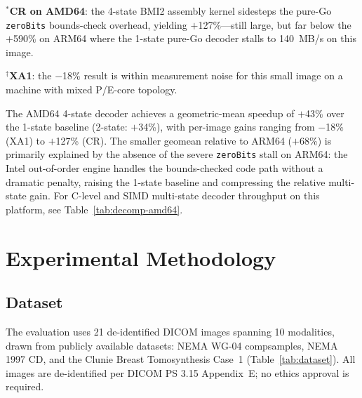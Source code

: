 \documentclass[journal]{IEEEtran}
\begin{document}
$^*$\textbf{CR on AMD64}: the 4-state BMI2 assembly kernel sidesteps the
pure-Go \texttt{zeroBits} bounds-check overhead, yielding $+$127\%---still
large, but far below the $+$590\% on ARM64 where the 1-state pure-Go
decoder stalls to 140~MB/s on this image.

$^\dagger$\textbf{XA1}: the $-$18\% result is within measurement noise for
this small image on a machine with mixed P/E-core topology.

The AMD64 4-state decoder achieves a geometric-mean speedup of $+$43\%
over the 1-state baseline (2-state: $+$34\%), with per-image gains
ranging from $-$18\% (XA1) to $+$127\% (CR). The smaller geomean
relative to ARM64 ($+$68\%) is primarily explained by the absence of
the severe \texttt{zeroBits} stall on ARM64: the Intel out-of-order
engine handles the bounds-checked code path without a dramatic penalty,
raising the 1-state baseline and compressing the relative multi-state
gain. For C-level and SIMD multi-state decoder throughput on this
platform, see Table~\ref{tab:decomp-amd64}.

\section{Experimental Methodology}
\label{sec:methodology}

\subsection{Dataset}

The evaluation uses 21 de-identified DICOM images spanning 10 modalities, drawn
from publicly available datasets: NEMA WG-04 compsamples, NEMA 1997 CD, and the
Clunie Breast Tomosynthesis Case~1 (Table~\ref{tab:dataset}). All images are
de-identified per DICOM PS 3.15 Appendix~E; no ethics approval is required.
\end{document}
